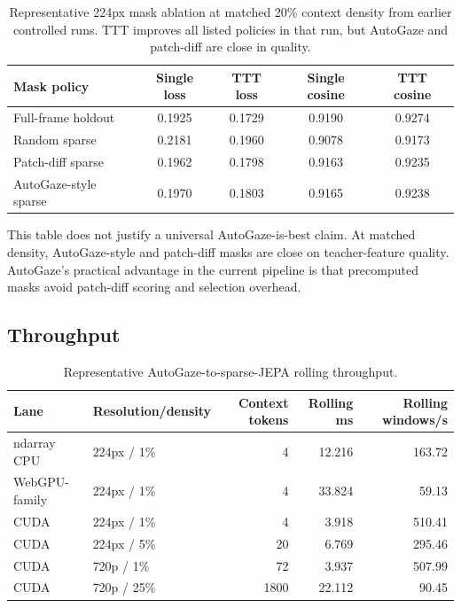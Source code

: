 \documentclass[10pt]{article}
\begin{document}
\begin{table}[t]
\centering
\caption{Representative 224px mask ablation at matched 20\% context density
from earlier controlled runs.  TTT improves all listed policies in that run,
but AutoGaze and patch-diff are close in quality.}
\label{tab:masks}
\begin{tabular}{lcccc}
\toprule
Mask policy & Single loss & TTT loss & Single cosine & TTT cosine \\
\midrule
Full-frame holdout & 0.1925 & 0.1729 & 0.9190 & 0.9274 \\
Random sparse & 0.2181 & 0.1960 & 0.9078 & 0.9173 \\
Patch-diff sparse & 0.1962 & 0.1798 & 0.9163 & 0.9235 \\
AutoGaze-style sparse & 0.1970 & 0.1803 & 0.9165 & 0.9238 \\
\bottomrule
\end{tabular}
\end{table}

This table does not justify a universal AutoGaze-is-best claim.  At matched
density, AutoGaze-style and patch-diff masks are close on teacher-feature
quality.  AutoGaze's practical advantage in the current pipeline is that
precomputed masks avoid patch-diff scoring and selection overhead.

\subsection{Throughput}

\begin{table}[t]
\centering
\caption{Representative AutoGaze-to-sparse-JEPA rolling throughput.}
\label{tab:e2e}
\begin{tabular}{llrrr}
\toprule
Lane & Resolution/density & Context tokens & Rolling ms & Rolling windows/s \\
\midrule
ndarray CPU & 224px / 1\% & 4 & 12.216 & 163.72 \\
WebGPU-family & 224px / 1\% & 4 & 33.824 & 59.13 \\
CUDA & 224px / 1\% & 4 & 3.918 & 510.41 \\
CUDA & 224px / 5\% & 20 & 6.769 & 295.46 \\
CUDA & 720p / 1\% & 72 & 3.937 & 507.99 \\
CUDA & 720p / 25\% & 1800 & 22.112 & 90.45 \\
\bottomrule
\end{tabular}
\end{table}
\end{document}
